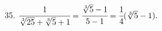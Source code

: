 35. $\cfrac{1}{\sqrt[3]{25}+\sqrt[3]{5}+1}=\cfrac{\sqrt[3]{5}-1}{5-1}=\cfrac{1}{4}(\sqrt[3]{5}-1).$\\

